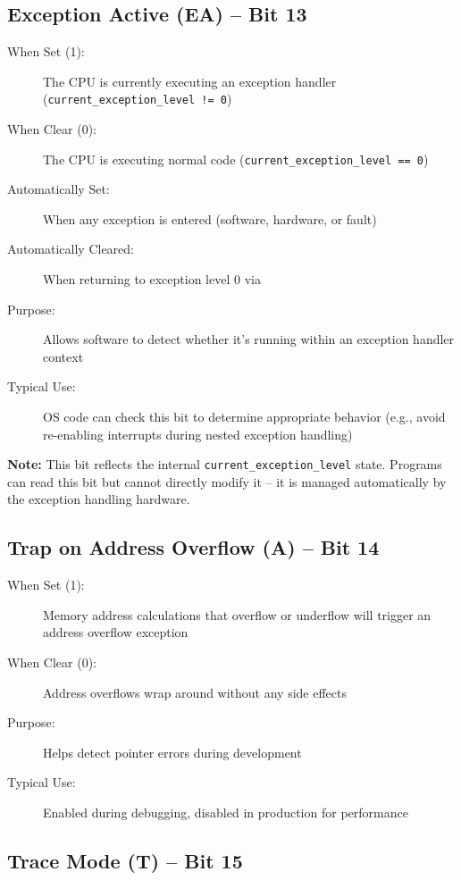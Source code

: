 \subsection{Exception Active (EA) -- Bit 13}

\begin{description}
	\item[When Set (1):] The CPU is currently executing an exception handler (\texttt{current\_exception\_level != 0})
	\item[When Clear (0):] The CPU is executing normal code (\texttt{current\_exception\_level == 0})
	\item[Automatically Set:] When any exception is entered (software, hardware, or fault)
	\item[Automatically Cleared:] When returning to exception level 0 via 
	\item[Purpose:] Allows software to detect whether it's running within an exception handler context
	\item[Typical Use:] OS code can check this bit to determine appropriate behavior (e.g., avoid re-enabling interrupts during
	      nested exception handling)
\end{description}

\textbf{Note:} This bit reflects the internal \texttt{current\_exception\_level} state. Programs can read this bit but
cannot directly modify it -- it is managed automatically by the exception handling hardware.

\subsection{Trap on Address Overflow (A) -- Bit 14}

\begin{description}
	\item[When Set (1):] Memory address calculations that overflow or underflow will trigger an address overflow exception
	\item[When Clear (0):] Address overflows wrap around without any side effects
	\item[Purpose:] Helps detect pointer errors during development
	\item[Typical Use:] Enabled during debugging, disabled in production for performance
\end{description}

\subsection{Trace Mode (T) -- Bit 15}

